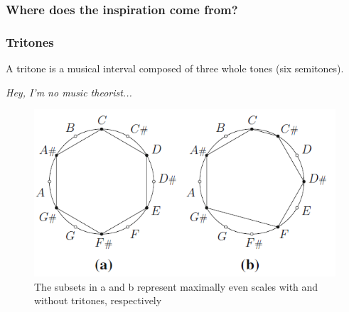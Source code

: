 \documentclass{beamer}
\begin{document}
\begin{frame}


\frametitle{Where does the inspiration come from?}
\end{frame}

\begin{frame}
\frametitle{Tritones}
A tritone is a musical interval
composed of three whole tones (six semitones).\pause
\vspace{1cm}

\emph{Hey, I'm no music theorist...}


\end{frame}
\begin{frame}
\begin{figure}[h!]
\centering
\includegraphics[scale=0.6]{tritone}
\caption{The subsets in a and b represent maximally even scales with and without tritones, respectively}
\end{figure}
\end{frame}
\end{document}
